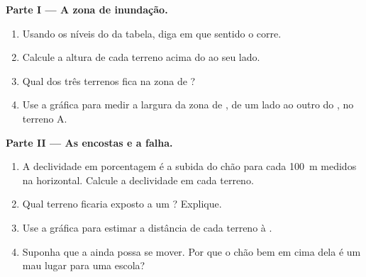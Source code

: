 \begin{problem}
\noindent\textbf{Parte I --- A zona de inundação.}\par\nopagebreak
\begin{enumerate}[beginpenalty=10000]
  \item Usando os níveis do  da tabela, diga em que sentido o 
        corre.
  \item Calcule a altura de cada terreno acima do  ao seu lado.
  \item Qual dos três terrenos fica na zona de ?
  \item Use a  gráfica para medir a largura da zona de ,
        de um lado ao outro do , no terreno A.
\end{enumerate}

\noindent\textbf{Parte II --- As encostas e a falha.}\par\nopagebreak
\begin{enumerate}[resume, beginpenalty=10000]
  \item A declividade em porcentagem é a subida do chão para cada
        \qty{100}{m} medidos na horizontal. Calcule a declividade em cada
        terreno.
  \item Qual terreno ficaria exposto a um ? Explique.
  \item Use a  gráfica para estimar a distância de cada terreno à
        .
  \item Suponha que a  ainda possa se mover. Por que o chão bem em
        cima dela é um mau lugar para uma escola?
\end{enumerate}


\end{problem}
